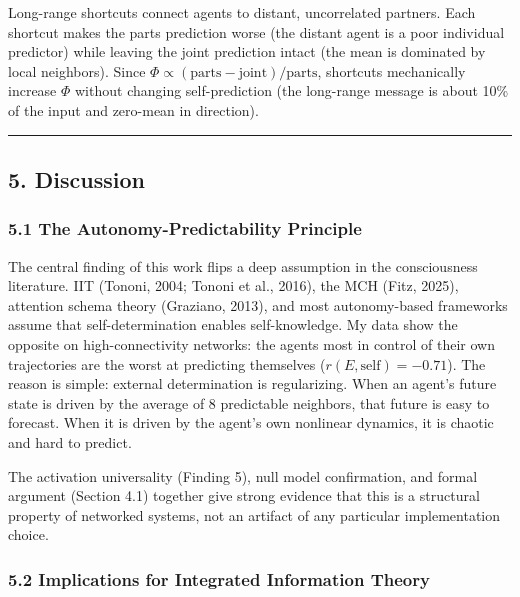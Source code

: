 \documentclass[
  11pt,
]{article}
\begin{document}
Long-range shortcuts connect agents to distant, uncorrelated partners.
Each shortcut makes the parts prediction worse (the distant agent is a
poor individual predictor) while leaving the joint prediction intact
(the mean is dominated by local neighbors). Since
\(\Phi \propto (\text{parts} - \text{joint}) / \text{parts}\), shortcuts
mechanically increase \(\Phi\) without changing self-prediction (the
long-range message is about 10\% of the input and zero-mean in
direction).

\begin{center}\rule{0.5\linewidth}{0.5pt}\end{center}

\subsection{5. Discussion}\label{discussion}

\subsubsection{5.1 The Autonomy-Predictability
Principle}\label{the-autonomy-predictability-principle}

The central finding of this work flips a deep assumption in the
consciousness literature. IIT (Tononi, 2004; Tononi et al., 2016), the
MCH (Fitz, 2025), attention schema theory (Graziano, 2013), and most
autonomy-based frameworks assume that self-determination enables
self-knowledge. My data show the opposite on high-connectivity networks:
the agents most in control of their own trajectories are the worst at
predicting themselves (\(r(E, \text{self}) = -0.71\)). The reason is
simple: external determination is regularizing. When an agent's future
state is driven by the average of 8 predictable neighbors, that future
is easy to forecast. When it is driven by the agent's own nonlinear
dynamics, it is chaotic and hard to predict.

The activation universality (Finding 5), null model confirmation, and
formal argument (Section 4.1) together give strong evidence that this is
a structural property of networked systems, not an artifact of any
particular implementation choice.

\subsubsection{5.2 Implications for Integrated Information
Theory}\label{implications-for-integrated-information-theory}
\end{document}
